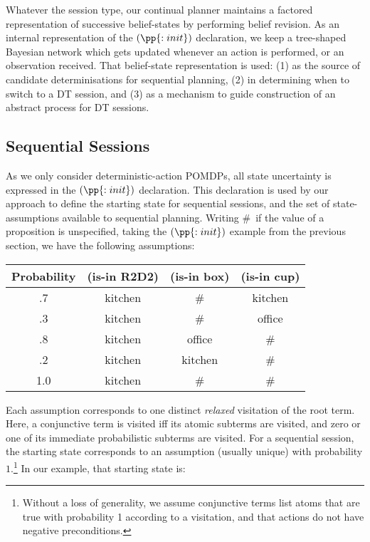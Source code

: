 Whatever the session type, our continual planner maintains a factored
representation of successive belief-states by performing belief
revision. As an internal representation of the $(\pp{:init})$
declaration, we keep a tree-shaped Bayesian network which gets updated
whenever an action is performed, or an observation received. That
belief-state representation is used: (1) as the source of candidate
determinisations for sequential planning, (2) in determining when to
switch to a DT session, and (3) as a mechanism to guide construction
of an abstract process for DT sessions.

\subsection{Sequential Sessions}

As we only consider deterministic-action POMDPs, all state
uncertainty is expressed in the $(\pp{:init})$ declaration. This
declaration is used by our approach to define the starting state for
sequential sessions, and the set of state-assumptions available to
sequential planning.  Writing \#\ if the value of a proposition is
unspecified, taking the $(\pp{:init})$ example from the previous
section, we have the following assumptions:

\small
\begin{tabular}{cccc}
\hline
Probability & (is-in R2D2)  & (is-in box)  & (is-in cup) \\
\hline
.7 & kitchen & \# &  kitchen\\
.3 & kitchen & \# & office \\
.8 & kitchen & office & \# \\
.2 & kitchen & kitchen & \# \\
1.0 & kitchen & \# & \# \\
\hline
\end{tabular}
\normalsize

\noindent Each assumption corresponds to one distinct {\em
relaxed} visitation of the root term. Here, a conjunctive term is
visited iff its atomic subterms are visited, and zero or one of its
immediate probabilistic subterms are visited. For a sequential
session, the starting state corresponds to an assumption (usually
unique) with probability $1$.\footnote{Without a loss of generality,
we assume conjunctive terms list atoms that are true with
probability 1 according to a visitation, and that actions do not
have negative preconditions.}  In our example, that starting state is:

